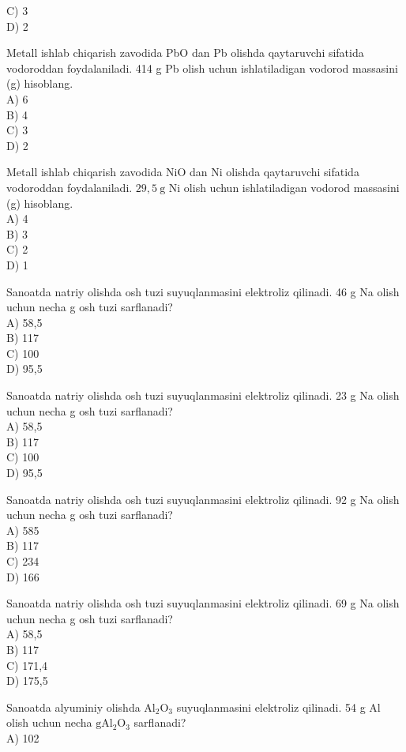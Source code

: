 C) 3\\
D) 2
  \item Metall ishlab chiqarish zavodida PbO dan Pb olishda qaytaruvchi sifatida vodoroddan foydalaniladi. 414 g Pb olish uchun ishlatiladigan vodorod massasini (g) hisoblang.\\
A) 6\\
B) 4\\
C) 3\\
D) 2
  \item Metall ishlab chiqarish zavodida NiO dan Ni olishda qaytaruvchi sifatida vodoroddan foydalaniladi. $29,5 \mathrm{~g}$ Ni olish uchun ishlatiladigan vodorod massasini (g) hisoblang.\\
A) 4\\
B) 3\\
C) 2\\
D) 1
  \item Sanoatda natriy olishda osh tuzi suyuqlanmasini elektroliz qilinadi. 46 g Na olish uchun necha g osh tuzi sarflanadi?\\
A) 58,5\\
B) 117\\
C) 100\\
D) 95,5
  \item Sanoatda natriy olishda osh tuzi suyuqlanmasini elektroliz qilinadi. 23 g Na olish uchun necha g osh tuzi sarflanadi?\\
A) 58,5\\
B) 117\\
C) 100\\
D) 95,5
  \item Sanoatda natriy olishda osh tuzi suyuqlanmasini elektroliz qilinadi. 92 g Na olish uchun necha g osh tuzi sarflanadi?\\
A) 585\\
B) 117\\
C) 234\\
D) 166
  \item Sanoatda natriy olishda osh tuzi suyuqlanmasini elektroliz qilinadi. 69 g Na olish uchun necha g osh tuzi sarflanadi?\\
A) 58,5\\
B) 117\\
C) 171,4\\
D) 175,5
  \item Sanoatda alyuminiy olishda $\mathrm{Al}_{2} \mathrm{O}_{3}$ suyuqlanmasini elektroliz qilinadi. 54 g Al olish uchun necha $\mathrm{g} \mathrm{Al}_{2} \mathrm{O}_{3}$ sarflanadi?\\
A) 102\\
